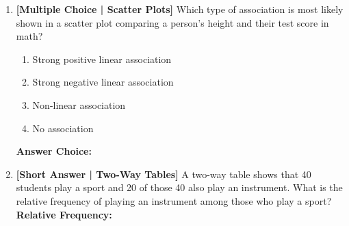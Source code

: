 \documentclass[12pt, letterpaper, fleqn]{article}
\newcommand{\blankshorter}{\underline{\hspace{2.0cm}}}
\newcommand{\blanklong}{\underline{\hspace{6.5cm}}}
\begin{document}
\begin{enumerate}[leftmargin=0.6cm, itemsep=\fill, start=12]

\item \textbf{[Multiple Choice | Scatter Plots]} Which type of association is most likely shown in a scatter plot comparing a person's height and their test score in math?
\begin{enumerate}[label=\Alph*)]
    \item Strong positive linear association
    \item Strong negative linear association
    \item Non-linear association
    \item No association
\end{enumerate}
\textbf{Answer Choice:} \blankshorter

\item \textbf{[Short Answer | Two-Way Tables]} A two-way table shows that 40 students play a sport and 20 of those 40 also play an instrument. What is the relative frequency of playing an instrument among those who play a sport?
\vspace{1.5cm} \\
\textbf{Relative Frequency:} \blanklong

\end{enumerate}
\end{document}
